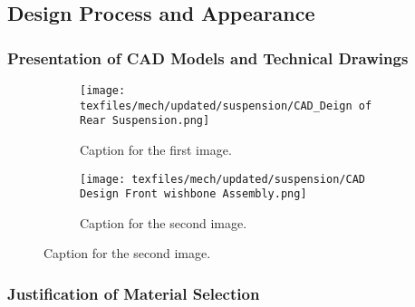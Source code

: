 \subsection{Design Process and Appearance}
\subsubsection{Presentation of CAD Models and Technical Drawings}
\begin{figure}[ht!]
  \centering
  \begin{subfigure}{.5\textwidth}
    \centering
    \texttt{[image: texfiles/mech/updated/suspension/CAD\_Deign of Rear Suspension.png]}
    \caption{Caption for the first image.}
    \label{fig:sub1}
  \end{subfigure}%
  \begin{subfigure}{.5\textwidth}
    \centering
    \texttt{[image: texfiles/mech/updated/suspension/CAD Design Front wishbone Assembly.png]}
    \caption{Caption for the second image.}
    \label{fig:sub2}
  \end{subfigure}%
\end{figure}
\newpage
\subsubsection{Justification of Material Selection}

